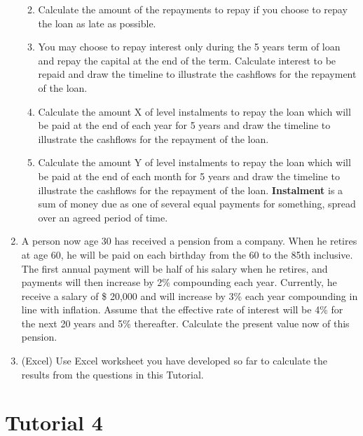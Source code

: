 \documentclass[
]{book}
\theoremstyle{definition}
\theoremstyle{definition}
\theoremstyle{definition}
\theoremstyle{definition}
\theoremstyle{remark}
\begin{document}
\begin{enumerate}
  \begin{enumerate}
  \def\labelenumii{\arabic{enumii}.}
  \item
    Calculate the amount of the repayments to repay if you choose to
    repay the loan as late as possible.
  \item
    You may choose to repay interest only during the 5 years term of
    loan and repay the capital at the end of the term. Calculate
    interest to be repaid and draw the timeline to illustrate the
    cashflows for the repayment of the loan.
  \item
    Calculate the amount X of level instalments to repay the loan
    which will be paid at the end of each year for 5 years and draw
    the timeline to illustrate the cashflows for the repayment of
    the loan.
  \item
    Calculate the amount Y of level instalments to repay the loan
    which will be paid at the end of each month for 5 years and draw
    the timeline to illustrate the cashflows for the repayment of
    the loan. \textbf{Instalment} is a sum of money due as one of several
    equal payments for something, spread over an agreed period of
    time.
  \end{enumerate}
\item
  A person now age 30 has received a pension from a company. When he
  retires at age 60, he will be paid on each birthday from the 60 to
  the 85th inclusive. The first annual payment will be half of his
  salary when he retires, and payments will then increase by 2\%
  compounding each year. Currently, he receive a salary of \$ 20,000
  and will increase by 3\% each year compounding in line with
  inflation. Assume that the effective rate of interest will be 4\% for
  the next 20 years and 5\% thereafter. Calculate the present value now
  of this pension.
\item
  (Excel) Use Excel worksheet you have developed so far to calculate
  the results from the questions in this Tutorial.
\end{enumerate}

\section{Tutorial 4}\label{tutorial-4}
\end{document}
